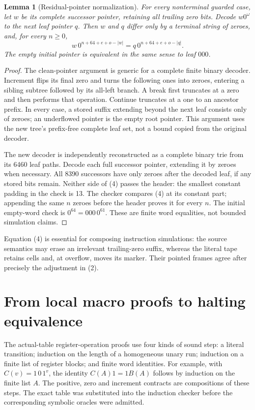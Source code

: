 \documentclass[11pt]{article}
\newtheorem{lemma}{Lemma}
\begin{document}
\begin{lemma}[Residual-pointer normalization]
For every nonterminal guarded case, let $w$ be its complete successor
pointer, retaining all trailing zero bits. Decode $w0^\omega$ to the next
leaf pointer $q$. Then $w$ and $q$ differ only by a terminal string of
zeroes, and, for every $n\geq0$,
\[
 w\,0^{n+64+e+o-|w|}
   =q\,0^{n+64+e+o-|q|}.                  \tag{4}
\]
The empty initial pointer is equivalent in the same sense to leaf $000$.
\end{lemma}

\begin{proof}
The clean-pointer argument is generic for a complete finite binary decoder.
Increment flips its final zero and turns the following ones into zeroes,
entering a sibling subtree followed by its all-left branch. A break first
truncates at a zero and then performs that operation. Continue truncates at
a one to an ancestor prefix. In every case, a stored suffix extending beyond
the next leaf consists only of zeroes; an underflowed pointer is the empty
root pointer. This argument uses the new tree's prefix-free complete leaf
set, not a bound copied from the original decoder.

The new decoder is independently reconstructed as a complete binary trie
from its 6460 leaf paths. Decode each full successor pointer, extending it
by zeroes when necessary. All 8390 successors have only zeroes after the
decoded leaf, if any stored bits remain. Neither side of (4) passes the
header: the smallest constant padding in the check is 13. The checker
compares (4) at its constant part; appending the same $n$ zeroes before the
header proves it for every $n$. The initial empty-word check is
$0^{64}=000\,0^{61}$. These are finite word equalities, not bounded
simulation claims.
\end{proof}

Equation (4) is essential for composing instruction simulations: the source
semantics may erase an irrelevant trailing-zero suffix, whereas the literal
tape retains cells and, at overflow, moves its marker. Their pointed frames
agree after precisely the adjustment in (2).

\section{From local macro proofs to halting equivalence}

The actual-table register-operation proofs use four kinds of sound step:
a literal transition; induction on the length of a homogeneous unary run;
induction on a finite list of register blocks; and finite word identities.
For example, with $C(v)=1\,0\,1^v$, the identity
$C(A)1=1B(A)$ follows by induction on the finite list $A$. The positive,
zero and increment contracts are compositions of these steps. The exact
table was substituted into the induction checker before the corresponding
symbolic oracles were admitted.
\end{document}
